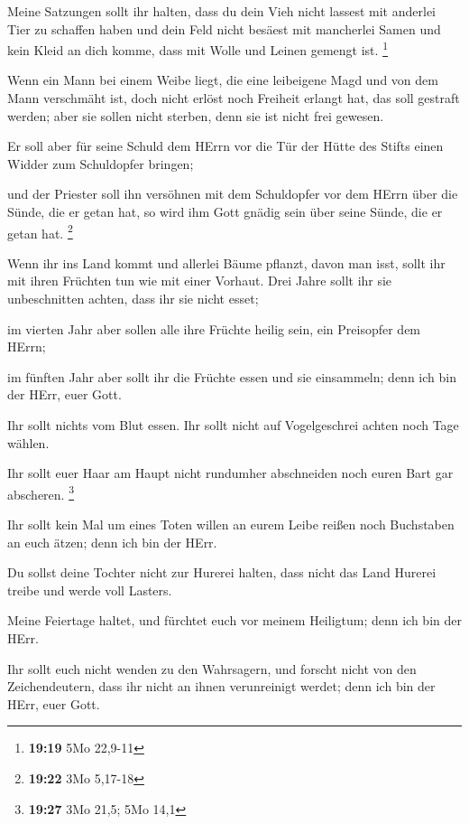  Meine Satzungen sollt ihr halten, dass du dein Vieh nicht
lassest mit anderlei Tier zu schaffen haben und dein Feld nicht besäest
mit mancherlei Samen und kein Kleid an dich komme, dass mit Wolle und
Leinen gemengt ist. \footnote{\textbf{19:19} 5Mo 22,9-11}

 Wenn ein Mann bei einem Weibe liegt, die eine leibeigene
Magd und von dem Mann verschmäht ist, doch nicht erlöst noch Freiheit
erlangt hat, das soll gestraft werden; aber sie sollen nicht sterben,
denn sie ist nicht frei gewesen.

 Er soll aber für seine Schuld dem HErrn vor die Tür der
Hütte des Stifts einen Widder zum Schuldopfer bringen;

 und der Priester soll ihn versöhnen mit dem Schuldopfer
vor dem HErrn über die Sünde, die er getan hat, so wird ihm Gott gnädig
sein über seine Sünde, die er getan hat. \footnote{\textbf{19:22} 3Mo
  5,17-18}

 Wenn ihr ins Land kommt und allerlei Bäume pflanzt, davon
man isst, sollt ihr mit ihren Früchten tun wie mit einer Vorhaut. Drei
Jahre sollt ihr sie unbeschnitten achten, dass ihr sie nicht esset;

 im vierten Jahr aber sollen alle ihre Früchte heilig sein,
ein Preisopfer dem HErrn;

 im fünften Jahr aber sollt ihr die Früchte essen und sie
einsammeln; denn ich bin der HErr, euer Gott.

 Ihr sollt nichts vom Blut essen. Ihr sollt nicht auf
Vogelgeschrei achten noch Tage wählen.

 Ihr sollt euer Haar am Haupt nicht rundumher abschneiden
noch euren Bart gar abscheren. \footnote{\textbf{19:27} 3Mo 21,5; 5Mo
  14,1}

 Ihr sollt kein Mal um eines Toten willen an eurem Leibe
reißen noch Buchstaben an euch ätzen; denn ich bin der HErr.

 Du sollst deine Tochter nicht zur Hurerei halten, dass
nicht das Land Hurerei treibe und werde voll Lasters.

 Meine Feiertage haltet, und fürchtet euch vor meinem
Heiligtum; denn ich bin der HErr.

 Ihr sollt euch nicht wenden zu den Wahrsagern, und forscht
nicht von den Zeichendeutern, dass ihr nicht an ihnen verunreinigt
werdet; denn ich bin der HErr, euer Gott.

